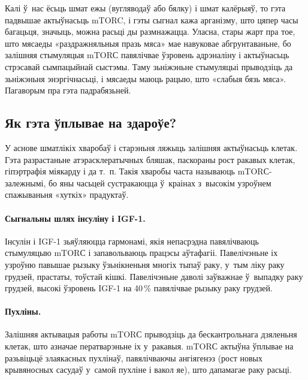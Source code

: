 
Калі ў~нас ёсьць шмат ежы (вугляводаў або бялку) і шмат калёрыяў, то гэта падвышае актыўнасьць mTORC, і гэты сыгнал кажа арганізму, што цяпер часы багацьця, значыць, можна расьці ды размнажацца. Уласна, стары жарт пра тое, што мясаеды «раздражняльныя празь мяса» мае навуковае абгрунтаваньне, бо залішняя стымуляцыя mTORС павялічвае ўзровень адрэналіну і актыўнасьць стрэсавай сымпацыйнай сыстэмы. Таму зьніжэньне стымуляцыі прыводзіць да зьніжэньня энэргічнасьці, і мясаеды маюць рацыю, што «слабыя бязь мяса». Пагаворым пра гэта падрабязьней.

\subsection{Як гэта ўплывае на здароўе?}

У аснове шматлікіх хваробаў і старэньня ляжыць залішняя актыўнасьць клетак. Гэта разрастаньне атэрасклератычных бляшак, паскораны рост ракавых клетак, гіпэртрафія міякарду і да т.~п. Такія хваробы часта называюць mTORС-залежнымі, бо яны часьцей сустракаюцца ў~краінах з~высокім узроўнем спажываньня «хуткіх» прадуктаў.

\paragraph{Сыгнальны шлях інсуліну і IGF-1.}
Інсулін і IGF-1 зьяўляюцца гармонамі, якія непасрэдна павялічваюць стымуляцыю mTORС і запавольваюць працэсы аўтафагіі. Павелічэньне іх узроўню павышае рызыку ўзьнікненьня многіх тыпаў раку, у~тым ліку раку грудзей, прастаты, тоўстай кішкі. Павелічэньне даволі заўважнае ў~выпадку раку грудзей, высокі ўзровень IGF-1 на 40\,\% павялічвае рызыку раку грудзей.

\paragraph{Пухліны.}
Залішняя актывацыя работы mTORС прыводзіць да бескантрольнага дзяленьня клетак, што азначае ператварэньне іх у~ракавыя. mTORС актыўна ўплывае на разьвіцьцё злаякасных пухлінаў, павялічваючы ангіягенэз (рост новых крывяносных сасудаў у~самой пухліне і вакол яе), што дапамагае раку расьці.


